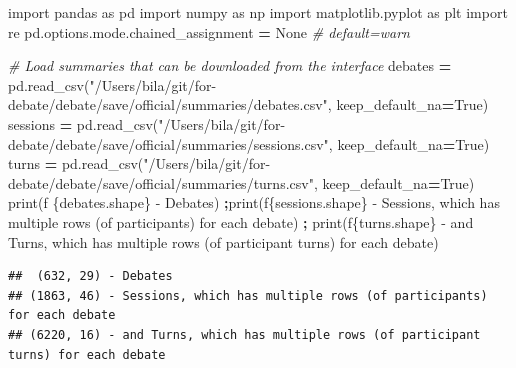 \documentclass[
]{article}
\newenvironment{Shaded}{\begin{snugshade}}{\end{snugshade}}
\newcommand{\BuiltInTok}[1]{#1}
\newcommand{\CommentTok}[1]{\textcolor[rgb]{0.56,0.35,0.01}{\textit{#1}}}
\newcommand{\ImportTok}[1]{#1}
\newcommand{\NormalTok}[1]{#1}
\newcommand{\OperatorTok}[1]{\textcolor[rgb]{0.81,0.36,0.00}{\textbf{#1}}}
\newcommand{\SpecialCharTok}[1]{\textcolor[rgb]{0.00,0.00,0.00}{#1}}
\newcommand{\SpecialStringTok}[1]{\textcolor[rgb]{0.31,0.60,0.02}{#1}}
\newcommand{\StringTok}[1]{\textcolor[rgb]{0.31,0.60,0.02}{#1}}
\newcommand{\VariableTok}[1]{\textcolor[rgb]{0.00,0.00,0.00}{#1}}
\begin{document}
\begin{Shaded}
\begin{Highlighting}[]
\ImportTok{import}\NormalTok{ pandas }\ImportTok{as}\NormalTok{ pd}
\ImportTok{import}\NormalTok{ numpy }\ImportTok{as}\NormalTok{ np}
\ImportTok{import}\NormalTok{ matplotlib.pyplot }\ImportTok{as}\NormalTok{ plt}
\ImportTok{import}\NormalTok{ re}
\NormalTok{pd.options.mode.chained\_assignment }\OperatorTok{=} \VariableTok{None}  \CommentTok{\# default=\textquotesingle{}warn\textquotesingle{}}

\CommentTok{\# Load summaries that can be downloaded from the interface}
\NormalTok{debates }\OperatorTok{=}\NormalTok{ pd.read\_csv(}\StringTok{"/Users/bila/git/for{-}debate/debate/save/official/summaries/debates.csv"}\NormalTok{, keep\_default\_na}\OperatorTok{=}\VariableTok{True}\NormalTok{)}
\NormalTok{sessions }\OperatorTok{=}\NormalTok{ pd.read\_csv(}\StringTok{"/Users/bila/git/for{-}debate/debate/save/official/summaries/sessions.csv"}\NormalTok{, keep\_default\_na}\OperatorTok{=}\VariableTok{True}\NormalTok{)}
\NormalTok{turns }\OperatorTok{=}\NormalTok{ pd.read\_csv(}\StringTok{"/Users/bila/git/for{-}debate/debate/save/official/summaries/turns.csv"}\NormalTok{, keep\_default\_na}\OperatorTok{=}\VariableTok{True}\NormalTok{)}
\BuiltInTok{print}\NormalTok{(}\SpecialStringTok{f\textquotesingle{} }\SpecialCharTok{\{}\NormalTok{debates}\SpecialCharTok{.}\NormalTok{shape}\SpecialCharTok{\}}\SpecialStringTok{ {-} Debates\textquotesingle{}}\NormalTok{) }\OperatorTok{;}\BuiltInTok{print}\NormalTok{(}\SpecialStringTok{f\textquotesingle{}}\SpecialCharTok{\{}\NormalTok{sessions}\SpecialCharTok{.}\NormalTok{shape}\SpecialCharTok{\}}\SpecialStringTok{ {-} Sessions, which has multiple rows (of participants) for each debate\textquotesingle{}}\NormalTok{) }\OperatorTok{;} \BuiltInTok{print}\NormalTok{(}\SpecialStringTok{f\textquotesingle{}}\SpecialCharTok{\{}\NormalTok{turns}\SpecialCharTok{.}\NormalTok{shape}\SpecialCharTok{\}}\SpecialStringTok{ {-} and Turns, which has multiple rows (of participant turns) for each debate\textquotesingle{}}\NormalTok{)}
\end{Highlighting}
\end{Shaded}

\begin{verbatim}
##  (632, 29) - Debates
## (1863, 46) - Sessions, which has multiple rows (of participants) for each debate
## (6220, 16) - and Turns, which has multiple rows (of participant turns) for each debate
\end{verbatim}
\end{document}
